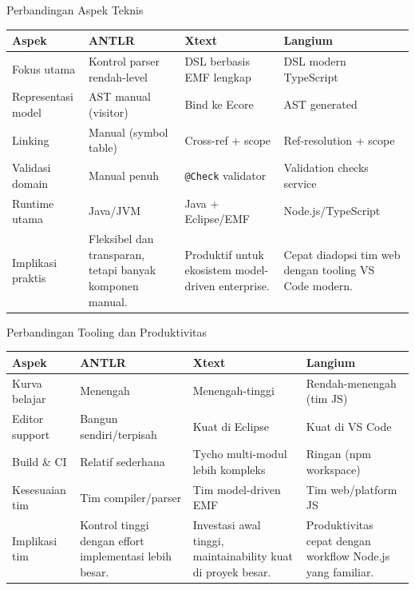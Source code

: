 \documentclass[aspectratio=169, table]{beamer}
\begin{document}
\begin{frame}{Perbandingan Aspek Teknis}
\scriptsize
{}
\begin{tabular}{|p{}|p{}|p{}|p{}|}
\hline
\textbf{Aspek} & \textbf{ANTLR} & \textbf{Xtext} & \textbf{Langium} \\
\hline
Fokus utama & Kontrol parser rendah-level & DSL berbasis EMF lengkap & DSL modern TypeScript \\
\hline
Representasi model & AST manual (visitor) & Bind ke Ecore & AST generated \\
\hline
Linking & Manual (symbol table) & Cross-ref + scope & Ref-resolution + scope \\
\hline
Validasi domain & Manual penuh & \texttt{@Check} validator & Validation checks service \\
\hline
Runtime utama & Java/JVM & Java + Eclipse/EMF & Node.js/TypeScript \\
\hline
Implikasi praktis & Fleksibel dan transparan, tetapi banyak komponen manual. & Produktif untuk ekosistem model-driven enterprise. & Cepat diadopsi tim web dengan tooling VS Code modern. \\
\hline
\end{tabular}
\end{frame}

\begin{frame}{Perbandingan Tooling dan Produktivitas}
\scriptsize
{}
\begin{tabular}{|p{}|p{}|p{}|p{}|}
\hline
\textbf{Aspek} & \textbf{ANTLR} & \textbf{Xtext} & \textbf{Langium} \\
\hline
Kurva belajar & Menengah & Menengah-tinggi & Rendah-menengah (tim JS) \\
\hline
Editor support & Bangun sendiri/terpisah & Kuat di Eclipse & Kuat di VS Code \\
\hline
Build \& CI & Relatif sederhana & Tycho multi-modul lebih kompleks & Ringan (npm workspace) \\
\hline
Kesesuaian tim & Tim compiler/parser & Tim model-driven EMF & Tim web/platform JS \\
\hline
Implikasi tim & Kontrol tinggi dengan effort implementasi lebih besar. & Investasi awal tinggi, maintainability kuat di proyek besar. & Produktivitas cepat dengan workflow Node.js yang familiar. \\
\hline
\end{tabular}
\end{frame}
\end{document}
